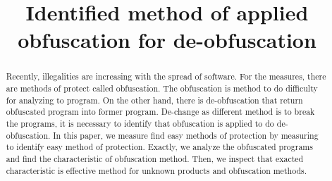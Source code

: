 \documentclass[conference]{IEEEtran}
\begin{document}
\title{Identified method of applied obfuscation for de-obfuscation}

\author{
\and
{}
}

\maketitle

\begin{abstract}
Recently, illegalities are increasing with the spread of software.
For the measures, there are methods of protect called obfuscation.
The obfuscation is method to do difficulty for analyzing to program.
On the other hand, there is de-obfuscation that return obfuscated
program into former program.  De-change as different method is to
break the programs, it is necessary to identify that obfuscation is
applied to do de-obfuscation.  In this paper, we measure find easy
methods of protection by measuring to identify easy method of
protection.  Exactly, we analyze the obfuscated programs and find the
characteristic of obfuscation method.  Then, we inspect that exacted
characteristic is effective method for unknown products and
obfuscation methods.
\end{abstract}


%
\IEEEpeerreviewmaketitle
\end{document}
